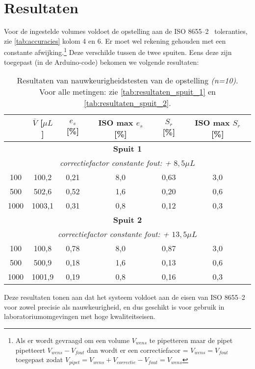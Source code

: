 \chapter{Resultaten}
Voor de ingestelde volumes voldoet de opstelling aan de ISO 8655--2\ \cite{RN51} toleranties, zie \autoref{tab:accuracies} kolom 4 en 6. Er moet wel rekening gehouden met een constante afwijking.\footnote{Als er wordt gevraagd om een volume $V_{wens}$ te pipetteren maar de pipet pipetteert $V_{wens}-V_{fout}$ dan wordt er een correctiefacor = $V_{wens}=V_{fout}$ toegepast zodat $V_{pipet} = V_{wens}+V_{correctie}-V_{fout} = V_{wens}$} Deze verschilde tussen de twee spuiten. Eens deze zijn toegepast (in de Arduino-code) bekomen we volgende resultaten:
\begin{table}[H] 
    \centering 
    \caption{Resultaten van nauwkeurigheidstesten van de opstelling \textit{(n=10)}.
    \\Voor alle metingen: zie \autoref{tab:resultaten_spuit_1} en \autoref{tab:resultaten_spuit_2}.}
    \begin{tabular}{|c|c|c|c|c|c|}
        \hline
        \textbf{\rule{0pt}{3ex}$V_{wens}$ [$\mu L$]} & 
        \textbf{$\bar{V}$ [$\mu L$]} & 
        \textbf{$e_s$ [\%]} & 
        \textbf{ISO max $e_s$ [\%]} &
        \textbf{$S_r$ [\%]} &
        \textbf{ISO max $S_r$ [\%]} \\
        \hline
        \multicolumn{6}{|c|}{\textbf{Spuit 1}} \\
        \multicolumn{6}{|c|}{\textit{correctiefactor constante fout: + $8,5\mu L$}}\\
        \hline
        100  & 100,2 & 0,21 & 8,0  & 0,63 & 3,0 \\
        500  & 502,6 & 0,52  & 1,6  & 0,20 & 0,6 \\
        1000 & 1003,1  & 0,31  & 0,8  & 0,12 & 0,3 \\
        \hline
        \multicolumn{6}{|c|}{\textbf{Spuit 2}}\\
        \multicolumn{6}{|c|}{\textit{correctiefactor constante fout: + $13,5\mu L$}}\\
        \hline
        100  & 100,8 & 0,78 & 8,0  & 0,87 & 3,0 \\
        500  & 500,9 & 0,18  & 1,6  & 0,13 & 0,6 \\
        1000 & 1001,9  & 0,19  & 0,8  & 0,16 & 0,3 \\
        \hline
    \end{tabular}\label{tab:accuracies}
\end{table}


Deze resultaten tonen aan dat het systeem voldoet aan de eisen van ISO 8655--2 voor zowel precisie als nauwkeurigheid, en dus geschikt is voor gebruik in laboratoriumomgevingen met hoge kwaliteitseisen.